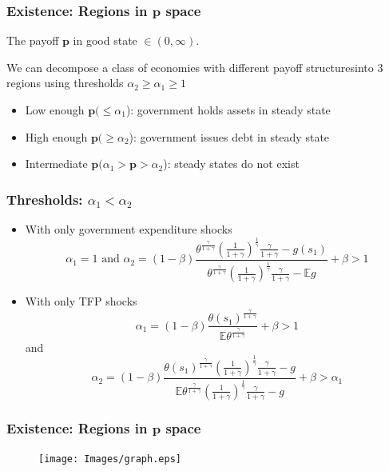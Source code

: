\documentclass{beamer}
\newcommand{\EE}{\mathbb E}
\begin{document}
\begin{frame}
\frametitle{Existence: Regions in $\bm{p}$ space}
 
The payoff $\bm{p}$ in good state 
$\in (0,\infty)$.

We can decompose a class of economies with different payoff structuresinto 3 regions using thresholds $\alpha_2\geq\alpha_1\geq1$
 
 
 
  \begin{itemize}
   \item Low enough $\bm{p}(\leq \alpha_1$): government holds assets in steady state
   \item High enough $\bm{p} (\geq \alpha_2$): government  issues debt  in steady state
   \item Intermediate $\bm{p} (\alpha_1>\bm{p}>\alpha_2$): steady states do not exist
  \end{itemize}
 
 \end{frame}

 
 
 
\begin{frame}
 \frametitle{Thresholds: $\alpha_1 <\alpha_2$}
	\begin{itemize}
		\item With only government expenditure shocks
		\[
			\alpha_1 = 1 \text{  and }  \alpha_2 = (1-\beta)\frac{\theta^\frac{\gamma}{1+\gamma}\left(\frac{1}{1+\gamma}\right)^\frac1\gamma\frac{\gamma}{1+\gamma}-g(s_1)}{\theta^\frac{\gamma}{1+\gamma}\left(\frac{1}{1+\gamma}\right)^\frac1\gamma\frac{\gamma}{1+\gamma}-\EE g} +\beta>1
		\]
		\item With only TFP shocks
		\[
			\alpha_1 = (1-\beta)\frac{\theta(s_1)^\frac{\gamma}{1+\gamma}}{\EE\theta^\frac{\gamma}{1+\gamma}}+\beta > 1
		\]and
		\[
		\alpha_2 = (1-\beta)\frac{\theta(s_1)^\frac{\gamma}{1+\gamma}\left(\frac{1}{1+\gamma}\right)^\frac1\gamma\frac{\gamma}{1+\gamma}-g}{\EE\theta^\frac{\gamma}{1+\gamma}\left(\frac{1}{1+\gamma}\right)^\frac1\gamma\frac{\gamma}{1+\gamma}-g}+\beta>\alpha_1
		\]
	\end{itemize}
 \end{frame}


\begin{frame}
   \frametitle{Existence: Regions in $\bm{p}$ space}
	\begin{figure}
		\begin{center}
		\texttt{[image: Images/graph.eps]}
	\end{center}	
	\end{figure}

  \end{frame}
\end{document}
